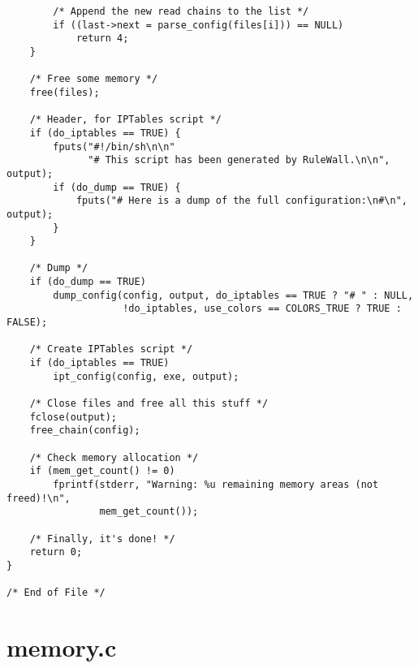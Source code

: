 \documentclass[a4paper,landscape,twocolumn,11pt]{article}
\begin{document}
\begin{lstlisting}
        /* Append the new read chains to the list */
        if ((last->next = parse_config(files[i])) == NULL)
            return 4;
    }

    /* Free some memory */
    free(files);

    /* Header, for IPTables script */
    if (do_iptables == TRUE) {
        fputs("#!/bin/sh\n\n"
              "# This script has been generated by RuleWall.\n\n", output);
        if (do_dump == TRUE) {
            fputs("# Here is a dump of the full configuration:\n#\n", output);
        }
    }

    /* Dump */
    if (do_dump == TRUE)
        dump_config(config, output, do_iptables == TRUE ? "# " : NULL,
                    !do_iptables, use_colors == COLORS_TRUE ? TRUE : FALSE);

    /* Create IPTables script */
    if (do_iptables == TRUE)
        ipt_config(config, exe, output);

    /* Close files and free all this stuff */
    fclose(output);
    free_chain(config);

    /* Check memory allocation */
    if (mem_get_count() != 0)
        fprintf(stderr, "Warning: %u remaining memory areas (not freed)!\n",
                mem_get_count());

    /* Finally, it's done! */
    return 0;
}

/* End of File */
\end{lstlisting}

\bigskip\section*{memory.c}
\end{document}
